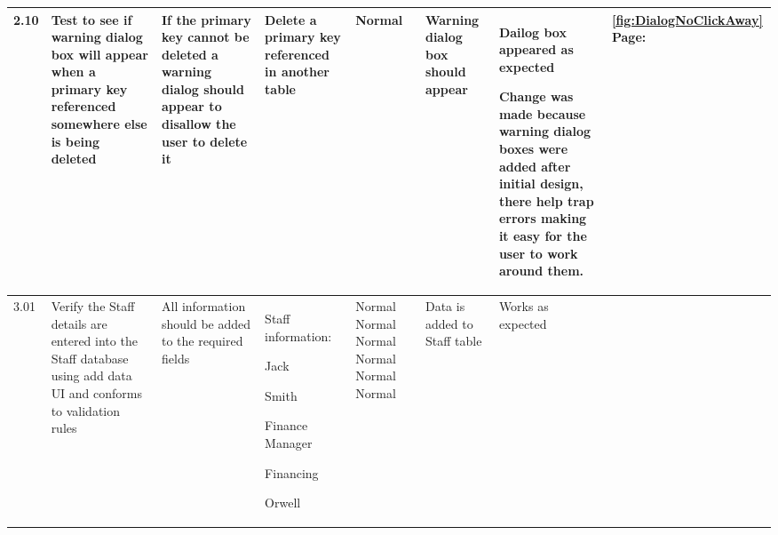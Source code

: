 \begin{landscape}
\begin{center}
\begin{longtable}{|p{1.5cm}|p{2cm}|p{2.5cm}|p{2cm}|p{2cm}|p{2cm}|p{3cm}|p{1.7cm}|}
\rowcolor{lightgray}2.10& Test to see if warning dialog box will appear when a primary key referenced somewhere else is being deleted & If the primary key cannot be deleted a warning dialog should appear to disallow the user to delete it & Delete a primary key referenced in another table & Normal &Warning dialog box should appear &Dailog box appeared as expected \par Change was made because warning dialog boxes were added after initial design, there help trap errors making it easy for the user to work around them.& \ref{fig:DialogNoClickAway} Page: \pageref{fig:DialogNoClickAway} \\ \hline


3.01 & Verify the Staff details are entered into the Staff database using add data UI and conforms to validation rules& All information should be added to the required fields  & Staff information: \par Jack \par Smith \par Finance Manager \par Financing \par Orwell & \newline \newline Normal \newline Normal \newline Normal \newline Normal \newline Normal \newline Normal& Data is added to Staff table &Works as expected& \\ \hline

\end{longtable}
\end{center}
\end{landscape}
